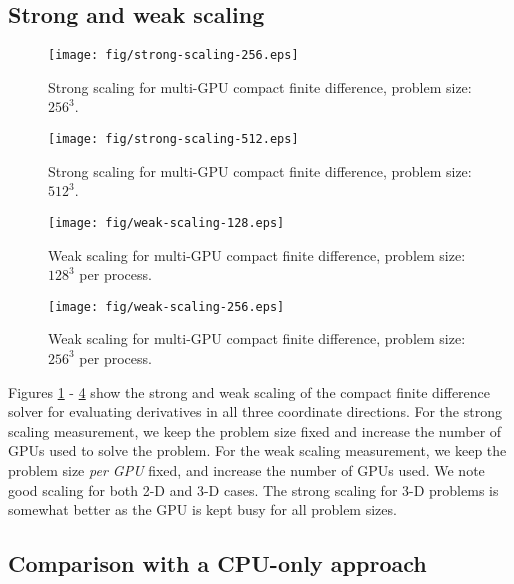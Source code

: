 \subsection{Strong and weak scaling}
\begin{figure}
\begin{center}
\texttt{[image: fig/strong-scaling-256.eps]}
\caption{Strong scaling for multi-GPU compact finite difference, problem size: $256^3$.}
\label{fig:strong-scaling-256}
\end{center}
\end{figure}
%
\begin{figure}
\begin{center}
\texttt{[image: fig/strong-scaling-512.eps]}
\caption{Strong scaling for multi-GPU compact finite difference, problem size: $512^3$.}
\label{fig:strong-scaling-512}
\end{center}
\end{figure}
%
\begin{figure}
\begin{center}
\texttt{[image: fig/weak-scaling-128.eps]}
\caption{Weak scaling for multi-GPU compact finite difference, problem size: $128^3$ per process.}
\label{fig:weak-scaling-128}
\end{center}
\end{figure}
%
\begin{figure}
\begin{center}
\texttt{[image: fig/weak-scaling-256.eps]}
\caption{Weak scaling for multi-GPU compact finite difference, problem size: $256^3$ per process.}
\label{fig:weak-scaling-256}
\end{center}
\end{figure}
%
Figures \ref{fig:strong-scaling-256} - \ref{fig:weak-scaling-256}
show the strong and weak scaling of the compact finite difference solver
for evaluating derivatives in all three coordinate directions.
For the strong scaling measurement,
we keep the problem size fixed
and increase the number of GPUs used to solve the problem.
For the weak scaling measurement,
we keep the problem size \emph{per GPU}
fixed, and increase the number of GPUs used.
We note good scaling for both 2-D and 3-D cases.
The strong scaling for 3-D problems is somewhat better
as the GPU is kept busy for all problem sizes.

\subsection{Comparison with a CPU-only approach}

